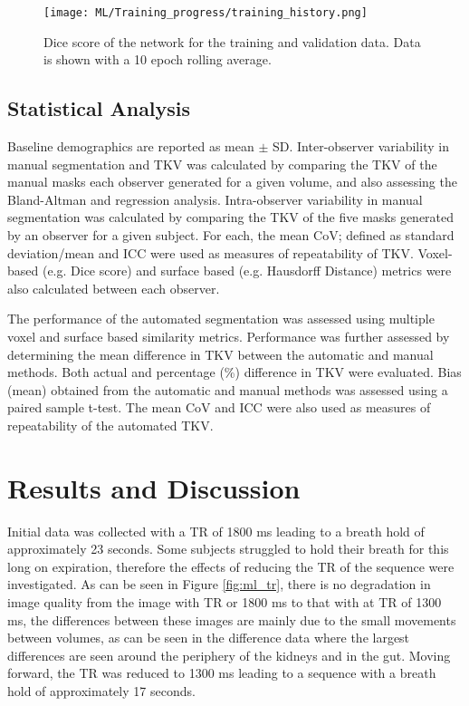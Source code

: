 \begin{figure}[h]
	\centering
	\texttt{[image: ML/Training\_progress/training\_history.png]}
	\caption{Dice score of the network for the training and validation data. Data is shown with a 10 epoch rolling average.}
	\label{fig:ml_training_history}	
\end{figure}

\subsection{Statistical Analysis}

Baseline demographics are reported as mean $\pm$ \ac{SD}. Inter-observer variability in manual segmentation and \ac{TKV} was calculated by comparing the \ac{TKV} of the manual masks each observer generated for a given volume, and also assessing the Bland-Altman and regression analysis. Intra-observer variability in manual segmentation was calculated by comparing the \ac{TKV} of the five masks generated by an observer for a given subject. For each, the mean \ac{CoV}; defined as standard deviation/mean and \ac{ICC} were used as measures of repeatability of \ac{TKV}. Voxel-based (e.g. Dice score) and surface based (e.g. Hausdorff Distance) metrics were also calculated between each observer.

The performance of the automated segmentation was assessed using multiple voxel and surface based similarity metrics. Performance was further assessed by determining the mean difference in \ac{TKV} between the automatic and manual methods. Both actual and percentage (\%) difference in \ac{TKV} were evaluated. Bias (mean) obtained from the automatic and manual methods was assessed using a paired sample t-test. The mean \ac{CoV} and \ac{ICC} were also used as measures of repeatability of the automated \ac{TKV}.

\section{Results and Discussion}

Initial data was collected with a \ac{TR} of 1800 ms leading to a breath hold of approximately 23 seconds. Some subjects struggled to hold their breath for this long on expiration, therefore the effects of reducing the \ac{TR} of the sequence were investigated. As can be seen in Figure \ref{fig:ml_tr}, there is no degradation in image quality from the image with \ac{TR} or 1800 ms to that with at \ac{TR} of 1300 ms, the differences between these images are mainly due to the small movements between volumes, as can be seen in the difference data where the largest differences are seen around the periphery of the kidneys and in the gut. Moving forward, the \ac{TR} was reduced to 1300 ms leading to a sequence with a breath hold of approximately 17 seconds.

